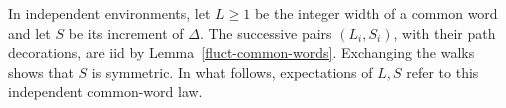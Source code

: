 In independent environments, let \(L\ge1\) be the integer width of a
common word and let \(S\) be its increment of \(\Delta\). The successive
pairs \((L_i,S_i)\), with their path decorations, are iid by
Lemma~\ref{fluct-common-words}. Exchanging the walks shows that \(S\) is
symmetric. In what follows, expectations of \(L,S\) refer to this
independent common-word law.


